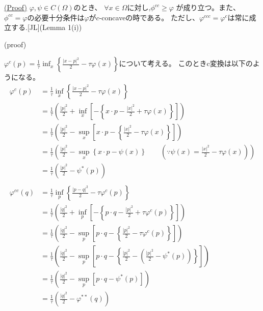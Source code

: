 \begin{lem}
    \label{lem:c-transform}
    \hyperlink{proof:lem:c-transform}{(Proof)}
    $\varphi, \psi \in C(\Omega)$のとき、
    $\forall x \in \Omega \text{に対し,}\phi^{cc} \ge \varphi$
    が成り立つ。また、$\phi^{cc} = \varphi$の必要十分条件は$\varphi$が$c$-concaveの時である。
    ただし、$\varphi^{ccc} = \varphi^c$は常に成立する.[JL](Lemma 1(i))
\end{lem}

(proof)

$\varphi^c(p) = \frac{1}{\tau}\inf_x\left\{\frac{|x-p|^2}{2} - \tau\varphi(x)\right\}$について考える。
このときc変換は以下のようになる。
\begin{align*}
    \varphi^c(p) &= \frac{1}{\tau} \inf_x\left\{\frac{|x-p|^2}{2} - \tau \varphi(x)\right\}\\
              &= \frac{1}{\tau}  \left(\frac{|p|^2}{2} + \inf_x\left[- \left\{x \cdot p - \frac{|x|^2}{2} + \tau\varphi(x) \right\}\right]\right)\\
              &= \frac{1}{\tau}  \left(\frac{|p|^2}{2} - \sup_x\left[x \cdot p - \left\{\frac{|x|^2}{2} - \tau\varphi(x)\right\}\right]\right)\\
              &= \frac{1}{\tau}  \left(\frac{|p|^2}{2} - \sup_x\left\{x \cdot p - \psi(x)\right\} \qquad (\because \psi(x) = \frac{|x|^2}{2} - \tau\varphi(x))\right)\\
              &= \frac{1}{\tau}  \left(\frac{|p|^2}{2} - \psi^*(p)\right)\\
    \\
    \varphi^{cc}(q) 
              &= \frac{1}{\tau} \inf_p\left\{\frac{|p-q|^2}{2} - \tau \varphi^c(p)\right\}\\
              &= \frac{1}{\tau}\left(\frac{|q|^2}{2} + \inf_p\left[- \left\{p \cdot q - \frac{|p|^2}{2} + \tau\varphi^c(p) \right\}\right]\right)\\
              &= \frac{1}{\tau}\left(\frac{|q|^2}{2} - \sup_p\left[p \cdot q - \left\{\frac{|p|^2}{2} - \tau\varphi^c(p)\right\}\right]\right)\\
              &= \frac{1}{\tau}\left(\frac{|q|^2}{2} - \sup_p\left[p \cdot q - \left\{\frac{|p|^2}{2} - \left(\frac{|p|^2}{2} - \psi^*(p)\right)\right\}\right]\right)\\
              &= \frac{1}{\tau}\left(\frac{|q|^2}{2} - \sup_p\left[p \cdot q - \psi^*(p)\right]\right) \\
              &= \frac{1}{\tau}\left(\frac{|q|^2}{2} - \varphi^{**}(q)\right)
\end{align*}

